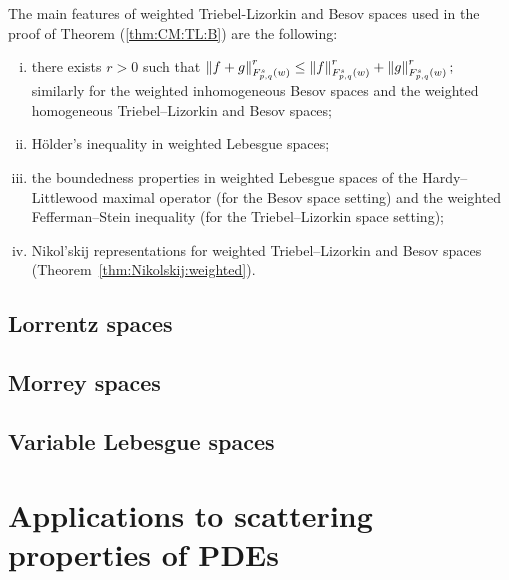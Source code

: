 The main features of weighted Triebel-Lizorkin and Besov spaces used in the proof of Theorem (\ref{thm:CM:TL:B}) are the following:
\begin{enumerate}[(i)]
\item\label{item:first} there exists $r>0$ such that $\norm{f+g}{\itlw{p}{s}{q}{w}}^r\le \norm{f}{\itlw{p}{s}{q}{w}}^r+\norm{g}{\itlw{p}{s}{q}{w}}^r;$ similarly for the weighted inhomogeneous  Besov spaces and the weighted homogeneous  Triebel--Lizorkin and Besov spaces;
\item \label{item:second} H\"older's inequality in weighted Lebesgue spaces;
\item \label{item:third}  the boundedness properties in weighted Lebesgue spaces  of the Hardy--Littlewood maximal operator (for the Besov space setting) and the weighted Fefferman--Stein inequality (for the Triebel--Lizorkin space setting);
\item \label{item:last} Nikol'skij representations for weighted Triebel--Lizorkin and Besov spaces (Theorem~\ref{thm:Nikolskij:weighted}).
\end{enumerate}
 \subsection{Lorrentz spaces}
 \subsection{Morrey spaces}
 \subsection{Variable Lebesgue spaces}
 
 \section{Applications to scattering properties of PDEs}